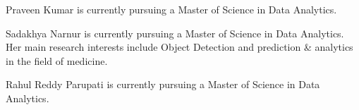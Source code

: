 \documentclass[10pt,journal,compsoc]{IEEEtran}
\begin{document}
\begin{IEEEbiographynophoto}{Praveen Kumar}
is currently pursuing a Master of Science in Data Analytics.
\end{IEEEbiographynophoto}

\begin{IEEEbiographynophoto}{Sadakhya Narnur}
is currently pursuing a Master of Science in Data Analytics. Her main research interests include Object Detection and prediction \& analytics in the field of medicine.
\end{IEEEbiographynophoto}

\begin{IEEEbiographynophoto}{Rahul Reddy Parupati}
is currently pursuing a Master of Science in Data Analytics.
\end{IEEEbiographynophoto}






\end{document}
